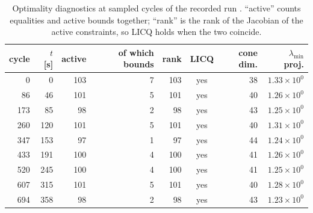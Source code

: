 \begin{table}[htbp]
  \centering
  \small
  \caption{Optimality diagnostics at sampled cycles of the recorded run \resBag. ``active'' counts equalities and active bounds together; ``rank'' is the rank of the Jacobian of the active constraints, so LICQ holds when the two coincide.}
  \label{res:tab:kkt}
  \begin{tabular}{rrrrrcrr}
    \toprule
    cycle & $t$ [s] & active & of which bounds & rank & LICQ & cone dim. & $\lambda_{\min}$ proj. \\
    \midrule
    0 & 0 & 103 & 7 & 103 & yes & 38 & $1.33\times 10^{0}$ \\
    86 & 46 & 101 & 5 & 101 & yes & 40 & $1.26\times 10^{0}$ \\
    173 & 85 & 98 & 2 & 98 & yes & 43 & $1.25\times 10^{0}$ \\
    260 & 120 & 101 & 5 & 101 & yes & 40 & $1.31\times 10^{0}$ \\
    347 & 153 & 97 & 1 & 97 & yes & 44 & $1.24\times 10^{0}$ \\
    433 & 191 & 100 & 4 & 100 & yes & 41 & $1.26\times 10^{0}$ \\
    520 & 245 & 100 & 4 & 100 & yes & 41 & $1.25\times 10^{0}$ \\
    607 & 315 & 101 & 5 & 101 & yes & 40 & $1.28\times 10^{0}$ \\
    694 & 358 & 98 & 2 & 98 & yes & 43 & $1.23\times 10^{0}$ \\
    \bottomrule
  \end{tabular}
\end{table}

